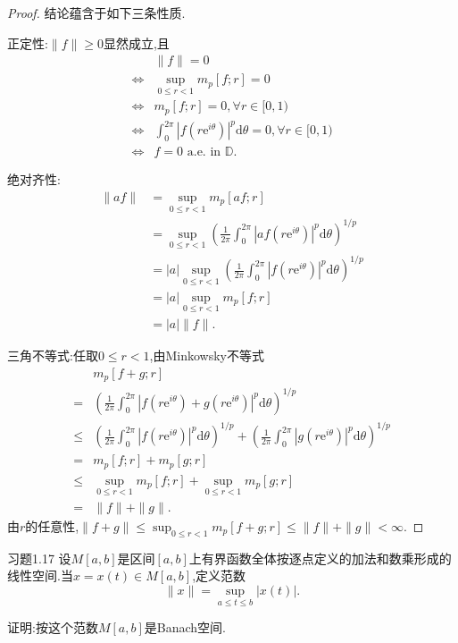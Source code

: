 \documentclass[lang = cn, scheme = chinese]{elegantbook}
\begin{document}
	\begin{proof}
		结论蕴含于如下三条性质.
		
		正定性:$\|f\|\ge 0$显然成立,且
		\begin{align*}
			&\|f\|=0\\
			\iff &\sup_{0\le r<1}m_p[f;r]=0\\
			\iff &m_p[f;r]=0,\forall r\in[0,1)\\
			\iff &\int_0^{2\pi}|f(r\mathrm{e}^{i\theta})|^p\mathrm{d}\theta=0,\forall r\in[0,1)\\
			\iff &f=0\text{ a.e. in }\mathbb{D}.
		\end{align*}
		
		绝对齐性:
		\begin{align*}
			\|af\|
			& = \sup_{0\le r<1}m_p[af;r]\\
			& = \sup_{0\le r<1}\left(\frac{1}{2\pi}\int_0^{2\pi}|af(r\mathrm{e}^{i\theta})|^p\mathrm{d}\theta\right)^{1/p}\\
			& = |a|\sup_{0\le r<1}\left(\frac{1}{2\pi}\int_0^{2\pi}|f(r\mathrm{e}^{i\theta})|^p\mathrm{d}\theta\right)^{1/p}\\
			& = |a|\sup_{0\le r<1}m_p[f;r]\\
			& = |a|\|f\|.
		\end{align*}
		
		三角不等式:任取$0\le r<1$,由Minkowsky不等式
		\begin{align*}
			&m_p[f+g;r]\\
			=&\left(\frac{1}{2\pi}\int_0^{2\pi}|f(r\mathrm{e}^{i\theta})+g(r\mathrm{e}^{i\theta})|^p\mathrm{d}\theta\right)^{1/p}\\
			\le &\left(\frac{1}{2\pi}\int_0^{2\pi}|f(r\mathrm{e}^{i\theta})|^p\mathrm{d}\theta\right)^{1/p}+\left(\frac{1}{2\pi}\int_0^{2\pi}|g(r\mathrm{e}^{i\theta})|^p\mathrm{d}\theta\right)^{1/p}\\
			=&m_p[f;r]+m_p[g;r]\\
			\le &\sup_{0\le r <1}m_p[f;r]+\sup_{0\le r <1}m_p[g;r]\\
			=& \|f\|+\|g\|.
		\end{align*}
		由$r$的任意性,$\displaystyle\|f+g\|\le\sup_{0\le r<1}m_p[f+g;r]\le \|f\|+\|g\|<\infty$.
	\end{proof}
	
	\begin{proposition}{习题1.17}
		设$M[a,b]$是区间$[a,b]$上有界函数全体按逐点定义的加法和数乘形成的线性空间.当$x=x(t)\in M[a,b]$,定义范数
		$$
		\|x\|=\sup_{a\le t\le b}|x(t)|.
		$$
		
		证明:按这个范数$M[a,b]$是Banach空间.
	\end{proposition}
	
\end{document}
